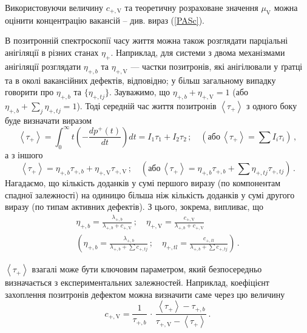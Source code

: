 \documentclass[10pt,a5paper,titlepage,oneside]{book}
\numberwithin{equation}{part}
\begin{document}
Використовуючи  величину $c_{+,\mathrm{V}}$ та теоретичну розраховане значення $\mu_\mathrm{V}$
можна оцінити концентрацію вакансій -- див. вираз (\ref{PASc}).


В позитронній спектроскопії часу життя можна також розглядати
парціальні анігіляції в різних станах $\eta_+$.
Наприклад,
для системи з двома механізмами анігіляції
розглядати $\eta_{+,b}$ та $\eta_{+,\mathrm{V}}$ ---
частки позитронів, які анігілювали у ґратці та в околі вакансійних
дефектів, відповідно;
у більш загальному випадку говорити про $\eta_{+,b}$ та $\{\eta_{+,tj}\}$.
Зауважимо, що $\eta_{+,b}+\eta_{+,\mathrm{V}}=1$
(або $\eta_{+,b}+\sum_j\eta_{+,tj}=1$).
Тоді середній час життя позитронів $\left\langle\tau_+\right\rangle$
з одного боку буде визначати виразом
\begin{equation*}
\left\langle\tau_+\right\rangle=\int_0^\infty t\left(-\frac{dp^+(t)}{dt}\right)dt=I_1\tau_{1}+I_2\tau_{2}\,;
\quad\left(\text{або}\,\left\langle\tau_+\right\rangle=\sum I_i \tau_{i}\right)\,,
\end{equation*}
а з іншого
\begin{equation*}
\left\langle\tau_+\right\rangle=\eta_{+,b}\tau_{+,b}+\eta_{+,\mathrm{V}}\tau_{+,\mathrm{V}}\,;
\quad\left(\text{або}\,\left\langle\tau_+\right\rangle=\eta_{+,b}\tau_{+,b}+\sum \eta_{+,tj}\tau_{+,tj}\right)\,.
\end{equation*}
Нагадаємо, що кількість доданків у сумі першого виразу (по компонентам спадної залежності) на
одиницю більша ніж кількість доданків у сумі другого виразу (по типам активних дефектів).
З цього, зокрема, випливає, що
\begin{gather*}
\eta_{+,b}=\frac{\lambda_{+,b}}{\lambda_{+,b}+c_{+,\mathrm{V}}}\,;\quad
\eta_{+,\mathrm{V}}=\frac{c_{+,\mathrm{V}}}{\lambda_{+,b}+c_{+,\mathrm{V}}} \\
\left(\eta_{+,b}=\frac{\lambda_{+,b}}{\lambda_{+,b}+\sum c_{+,tj}}\,;\quad
\eta_{+,tl}=\frac{c_{+,tl}}{\lambda_{+,b}+\sum c_{+,tj}} \right)\,.
\end{gather*}

$\left\langle\tau_+\right\rangle$ взагалі може бути ключовим параметром,
який безпосередньо визначається з експериментальних залежностей.
Наприклад, коефіцієнт захоплення позитронів дефектом можна визначити саме через цю величину
\begin{equation*}
c_{+,\mathrm{V}}=\frac{1}{\tau_{+,b}}\,\cdot\,\frac{\left\langle\tau_+\right\rangle-\tau_{+,b}}{\tau_{+,\mathrm{V}}-\left\langle\tau_+\right\rangle}\,.
\end{equation*}
\end{document}
